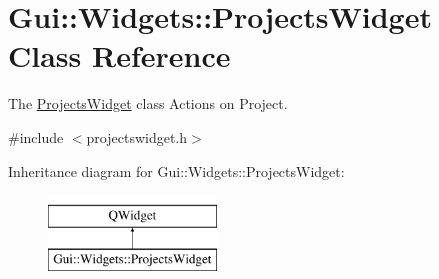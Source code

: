 \hypertarget{classGui_1_1Widgets_1_1ProjectsWidget}{}\section{Gui\+:\+:Widgets\+:\+:Projects\+Widget Class Reference}
\label{classGui_1_1Widgets_1_1ProjectsWidget}


The \hyperlink{classGui_1_1Widgets_1_1ProjectsWidget}{Projects\+Widget} class Actions on Project.  




{\ttfamily \#include $<$projectswidget.\+h$>$}

Inheritance diagram for Gui\+:\+:Widgets\+:\+:Projects\+Widget\+:\begin{figure}[H]
\begin{center}
\leavevmode
\includegraphics[height=2.000000cm]{dc/d8c/classGui_1_1Widgets_1_1ProjectsWidget}
\end{center}
\end{figure}
